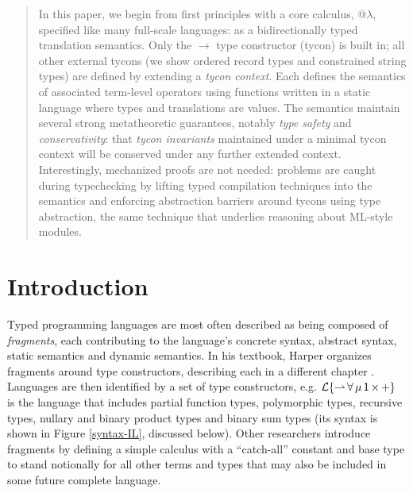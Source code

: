 \documentclass[10pt,preprint]{sigplanconf}
\begin{document}
\begin{abstract}
In this paper, we begin from first principles with a core calculus, @$\lambda$, specified like many full-scale languages: as a bidirectionally typed translation semantics. Only the $\rightarrow$ type constructor (tycon) is built in; all other external tycons (we show ordered record types and constrained string types) are defined by extending a \emph{tycon context}. Each defines the semantics of associated term-level operators using functions written in a static language where types and translations are values. The semantics maintain several strong metatheoretic guarantees, notably \emph{type safety} and \emph{conservativity}: that \emph{tycon  invariants} maintained under a minimal tycon context will be conserved under any further extended context. Interestingly, mechanized proofs are not needed: problems are caught during typechecking by lifting typed compilation techniques into the semantics and enforcing abstraction barriers around tycons using type abstraction, the same technique that underlies reasoning about ML-style modules.
\end{abstract}

\section{Introduction}\label{intro}
Typed programming languages are most often described as being composed of \emph{fragments}, each contributing to the language's concrete syntax, abstract syntax, static semantics and dynamic semantics. 
In his textbook, Harper organizes fragments around type constructors, describing each in a different chapter \cite{pfpl}. Languages are then identified by a set of type constructors, e.g. $\mathcal{L}\{{\rightharpoonup}\,{\forall}\,{\mu}\,{{\sf 1}}\,{\times}\,{+}\}$ is the language that includes partial function types, polymorphic types, recursive types, nullary and binary product types and binary sum types (its syntax is shown in Figure \ref{syntax-IL}, discussed below).
Other researchers introduce fragments by defining a simple calculus with a ``catch-all'' constant and base type to stand notionally for all other terms and types that may also be included in some future complete language.
\end{document}
